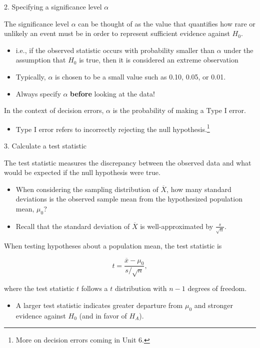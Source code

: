 \documentclass[
  ignorenonframetext,
  aspectratio=169]{beamer}
\providecommand{\tightlist}{%
  \setlength{\itemsep}{0pt}\setlength{\parskip}{0pt}}
\begin{document}
\begin{frame}{2. Specifying a significance level \(\alpha\)}
\protect\hypertarget{specifying-a-significance-level-alpha}{}
\small

The significance level \(\alpha\) can be thought of as the value that
quantifies how rare or unlikely an event must be in order to represent
sufficient evidence against \(H_0\).

\begin{itemize}
\item
  i.e., if the observed statistic occurs with probability smaller than
  \(\alpha\) under the assumption that \(H_0\) is true, then it is
  considered an extreme observation
\item
  Typically, \(\alpha\) is chosen to be a small value such as 0.10,
  0.05, or 0.01.
\item
  Always specify \(\alpha\) \textbf{before} looking at the data!
\end{itemize}

In the context of decision errors, \(\alpha\) is the probability of
making a Type I error.

\begin{itemize}
\tightlist
\item
  Type I error refers to incorrectly rejecting the null
  hypothesis.\footnote{More on decision errors coming in Unit 6.}
\end{itemize}
\end{frame}

\begin{frame}{3. Calculate a test statistic}
\protect\hypertarget{calculate-a-test-statistic}{}
\small

The test statistic measures the discrepancy between the observed data
and what would be expected if the null hypothesis were true.

\begin{itemize}
\item
  When considering the sampling distribution of \(\overline{X}\), how
  many standard deviations is the observed sample mean from the
  hypothesized population mean, \(\mu_0\)?
\item
  Recall that the standard deviation of \(\overline{X}\) is
  well-approximated by \(\frac{s}{\sqrt{n}}\).
\end{itemize}

When testing hypotheses about a population mean, the test statistic is

\[t = \frac{\overline{x} - \mu_0}{s/\sqrt{n}},\]

where the test statistic \(t\) follows a \(t\) distribution with \(n-1\)
degrees of freedom.

\begin{itemize}
\tightlist
\item
  A larger test statistic indicates greater departure from \(\mu_0\) and
  stronger evidence against \(H_0\) (and in favor of \(H_A\)).
\end{itemize}
\end{frame}
\end{document}
